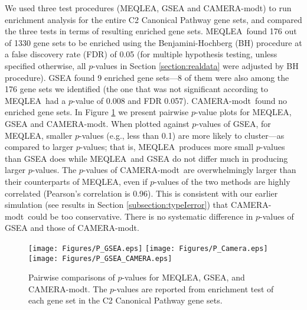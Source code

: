 \documentclass[useAMS,usenatbib, galley]{biom}
\newcommand{\OurMethod}{MEQLEA}
\newcommand{\CMT}{CAMERA-modt}
\begin{document}
	
	We used three test procedures (\OurMethod, GSEA and \CMT) to run enrichment analysis for the entire C2 Canonical Pathway gene sets, and compared the three tests in terms of resulting enriched gene sets. \OurMethod~found 176 out of 1330 gene sets to be enriched using the Benjamini-Hochberg (BH) procedure at a false discovery rate (FDR) of 0.05 (for multiple hypothesis testing, unless specified otherwise, all $p$-values in Section \ref{section:realdata} were adjusted by BH procedure). GSEA found 9 enriched gene sets---8 of them were also among the 176 gene sets we identified (the one that was not significant according to \OurMethod~had a $p$-value of 0.008 and FDR 0.057). \CMT~found no enriched gene sets. In Figure \ref{fig:HDdatap} we present pairwise $p$-value plots for \OurMethod, GSEA and \CMT. When plotted against $p$-values of GSEA, for \OurMethod, smaller $p$-values (e.g., less than 0.1) are more likely to cluster---as compared to larger $p$-values; that is, \OurMethod~produces more small $p$-values than GSEA does while \OurMethod~and GSEA do not differ much in producing larger $p$-values. The $p$-values of \CMT~are overwhelmingly larger than their counterparts of \OurMethod, even if $p$-values of the two methods are highly correlated (Pearson's correlation is 0.96). This is consistent with our earlier simulation (see results in Section \ref{subsection:typeIerror}) that \CMT~could be too conservative. There is no systematic difference in $p$-values of GSEA and those of \CMT. 
\begin{figure}
	\begin{center}
		\texttt{[image: Figures/P\_GSEA.eps]}
		\texttt{[image: Figures/P\_Camera.eps]}
		\texttt{[image: Figures/P\_GSEA\_CAMERA.eps]}
	\end{center} 
		\caption{Pairwise comparisons of $p$-values for \OurMethod, GSEA, and \CMT. The $p$-values are reported from enrichment test of each gene set in the C2 Canonical Pathway gene sets. }\label{fig:HDdatap}
\end{figure} 
	
	
\end{document}
